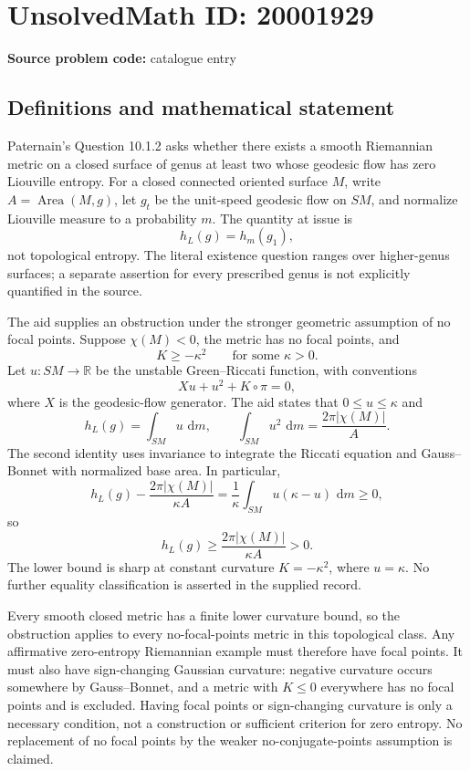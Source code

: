 \documentclass[11pt]{article}
\newcommand{\R}{\mathbb{R}}
\newcommand{\dd}{\,\mathrm{d}}
\begin{document}
\section*{UnsolvedMath ID: 20001929}
\textbf{Source problem code:} catalogue entry
\subsection{Definitions and mathematical statement}
Paternain's Question 10.1.2 asks whether there exists a smooth Riemannian metric on a closed surface of genus at least two whose geodesic flow has zero Liouville entropy. For a closed connected oriented surface \(M\), write \(A=\operatorname{Area}(M,g)\), let \(g_t\) be the unit-speed geodesic flow on \(SM\), and normalize Liouville measure to a probability \(m\). The quantity at issue is
\[
 h_L(g)=h_m(g_1),
\]
not topological entropy. The literal existence question ranges over higher-genus surfaces; a separate assertion for every prescribed genus is not explicitly quantified in the source.

The aid supplies an obstruction under the stronger geometric assumption of no focal points. Suppose \(\chi(M)<0\), the metric has no focal points, and
\[
 K\geq-\kappa^2\qquad\text{for some }\kappa>0.
\]
Let \(u:SM\to\R\) be the unstable Green--Riccati function, with conventions
\[
 Xu+u^2+K\circ\pi=0,
\]
where \(X\) is the geodesic-flow generator. The aid states that \(0\leq u\leq\kappa\) and
\[
 h_L(g)=\int_{SM}u\,\dd m,\qquad
 \int_{SM}u^2\,\dd m=\frac{2\pi|\chi(M)|}{A}.
\]
The second identity uses invariance to integrate the Riccati equation and Gauss--Bonnet with normalized base area. In particular,
\[
 h_L(g)-\frac{2\pi|\chi(M)|}{\kappa A}
 =\frac1\kappa\int_{SM}u(\kappa-u)\,\dd m\geq0,
\]
so
\[
 h_L(g)\geq\frac{2\pi|\chi(M)|}{\kappa A}>0.
\]
The lower bound is sharp at constant curvature \(K=-\kappa^2\), where \(u=\kappa\). No further equality classification is asserted in the supplied record.

Every smooth closed metric has a finite lower curvature bound, so the obstruction applies to every no-focal-points metric in this topological class. Any affirmative zero-entropy Riemannian example must therefore have focal points. It must also have sign-changing Gaussian curvature: negative curvature occurs somewhere by Gauss--Bonnet, and a metric with \(K\leq0\) everywhere has no focal points and is excluded. Having focal points or sign-changing curvature is only a necessary condition, not a construction or sufficient criterion for zero entropy. No replacement of no focal points by the weaker no-conjugate-points assumption is claimed.
\end{document}
